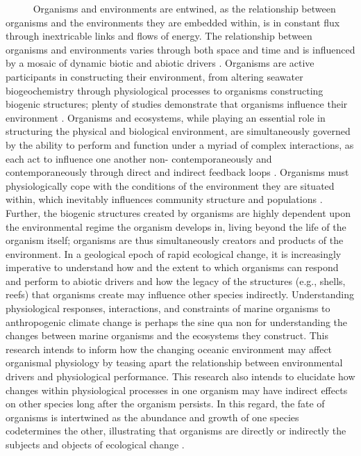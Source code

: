 \documentclass[
  12pt,
]{article}
\begin{document}
~~~~~ Organisms and environments are entwined, as the relationship
between organisms and the environments they are embedded within, is in
constant flux through inextricable links and flows of energy. The
relationship between organisms and environments varies through both
space and time and is influenced by a mosaic of dynamic biotic and
abiotic drivers \cite{connell1977mechanisms, menge1987community}.
Organisms are active participants in constructing their environment,
from altering seawater biogeochemistry through physiological processes
to organisms constructing biogenic structures; plenty of studies
demonstrate that organisms influence their environment
\cite{lewontin1983organism,estes1974sea}. Organisms and ecosystems,
while playing an essential role in structuring the physical and
biological environment, are simultaneously governed by the ability to
perform and function under a myriad of complex interactions, as each act
to influence one another non- contemporaneously and contemporaneously
through direct and indirect feedback loops
\cite{levin1974disturbance,paine1980food}. Organisms must
physiologically cope with the conditions of the environment they are
situated within, which inevitably influences community structure and
populations \cite{bozinovic2015physiological}. Further, the biogenic
structures created by organisms are highly dependent upon the
environmental regime the organism develops in, living beyond the life of
the organism itself; organisms are thus simultaneously creators and
products of the environment. In a geological epoch of rapid ecological
change, it is increasingly imperative to understand how and the extent
to which organisms can respond and perform to abiotic drivers and how
the legacy of the structures (e.g., shells, reefs) that organisms create
may influence other species indirectly. Understanding physiological
responses, interactions, and constraints of marine organisms to
anthropogenic climate change is perhaps the sine qua non for
understanding the changes between marine organisms and the ecosystems
they construct. This research intends to inform how the changing oceanic
environment may affect organismal physiology by teasing apart the
relationship between environmental drivers and physiological
performance. This research also intends to elucidate how changes within
physiological processes in one organism may have indirect effects on
other species long after the organism persists. In this regard, the fate
of organisms is intertwined as the abundance and growth of one species
codetermines the other, illustrating that organisms are directly or
indirectly the subjects and objects of ecological change
\cite{lewontin1983organism}.
\end{document}
